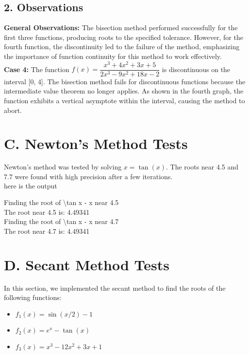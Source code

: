 \documentclass[a4paper]{article}
\begin{document}
\subsection*{2. Observations}
\textbf{General Observations:} The bisection method performed successfully for the first three functions, producing roots to the specified tolerance. However, for the fourth function, the discontinuity led to the failure of the method, emphasizing the importance of function continuity for this method to work effectively.\\
\textbf{Case 4:} The function \(f(x) = \dfrac{x^3 + 4x^2 + 3x + 5}{2x^3 - 9x^2 + 18x - 2}\) is discontinuous on the interval [0, 4]. The bisection method fails for discontinuous functions because the intermediate value theorem no longer applies. As shown in the fourth graph, the function exhibits a vertical asymptote within the interval, causing the method to abort.

\section*{C. Newton's Method Tests}
Newton's method was tested by solving $x = \tan(x)$. The roots near 4.5 and 7.7 were found with high precision after a few iterations.
\\here is the output

\begin{tcolorbox}[title=Output Results, colback=white, colframe=black]
  Finding the root of \textbackslash tan x - x near 4.5\\
  The root near 4.5 is: 4.49341\\
  Finding the root of \textbackslash tan x - x near 4.7\\
  The root near 4.7 is: 4.49341
\end{tcolorbox}

\section*{D. Secant Method Tests}

In this section, we implemented the secant method to find the roots of the following functions:

\begin{itemize}
    \item \( f_1(x) = \sin(x/2) - 1 \)
    \item \( f_2(x) = e^x - \tan(x) \)
    \item \( f_3(x) = x^3 - 12x^2 + 3x + 1 \)
\end{itemize}
\end{document}
